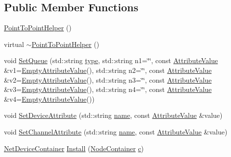 \subsection*{Public Member Functions}
\begin{DoxyCompactItemize}
\item 
\hyperlink{classns3_1_1PointToPointHelper_a1fe84d31984c0711db0b1516ecb1b579}{Point\+To\+Point\+Helper} ()
\item 
virtual \hyperlink{classns3_1_1PointToPointHelper_aaafd91a8b14a3af52e6d83b4c874462e}{$\sim$\+Point\+To\+Point\+Helper} ()
\item 
void \hyperlink{classns3_1_1PointToPointHelper_a546a5c9ae3c9eab0ea98b25fd41e3c95}{Set\+Queue} (std\+::string \hyperlink{visualizer-ideas_8txt_add98db9e15e2a58cf2b57623e7aa893a}{type}, std\+::string n1=\char`\"{}\char`\"{}, const \hyperlink{classns3_1_1AttributeValue}{Attribute\+Value} \&v1=\hyperlink{classns3_1_1EmptyAttributeValue}{Empty\+Attribute\+Value}(), std\+::string n2=\char`\"{}\char`\"{}, const \hyperlink{classns3_1_1AttributeValue}{Attribute\+Value} \&v2=\hyperlink{classns3_1_1EmptyAttributeValue}{Empty\+Attribute\+Value}(), std\+::string n3=\char`\"{}\char`\"{}, const \hyperlink{classns3_1_1AttributeValue}{Attribute\+Value} \&v3=\hyperlink{classns3_1_1EmptyAttributeValue}{Empty\+Attribute\+Value}(), std\+::string n4=\char`\"{}\char`\"{}, const \hyperlink{classns3_1_1AttributeValue}{Attribute\+Value} \&v4=\hyperlink{classns3_1_1EmptyAttributeValue}{Empty\+Attribute\+Value}())
\item 
void \hyperlink{classns3_1_1PointToPointHelper_a4577f5ab8c387e5528af2e0fbab1152e}{Set\+Device\+Attribute} (std\+::string \hyperlink{generate__test__data__lte__spectrum__model_8m_ab74e6bf80237ddc4109968cedc58c151}{name}, const \hyperlink{classns3_1_1AttributeValue}{Attribute\+Value} \&value)
\item 
void \hyperlink{classns3_1_1PointToPointHelper_a6b5317fd17fb61e5a53f8d66a90b63b9}{Set\+Channel\+Attribute} (std\+::string \hyperlink{generate__test__data__lte__spectrum__model_8m_ab74e6bf80237ddc4109968cedc58c151}{name}, const \hyperlink{classns3_1_1AttributeValue}{Attribute\+Value} \&value)
\item 
\hyperlink{classns3_1_1NetDeviceContainer}{Net\+Device\+Container} \hyperlink{classns3_1_1PointToPointHelper_ab9162fea3e88722666fed1106df1f9ec}{Install} (\hyperlink{classns3_1_1NodeContainer}{Node\+Container} \hyperlink{mmwave_2model_2fading-traces_2fading__trace__generator_8m_ae0323a9039add2978bf5b49550572c7c}{c})
\item 

\end{DoxyCompactItemize}
